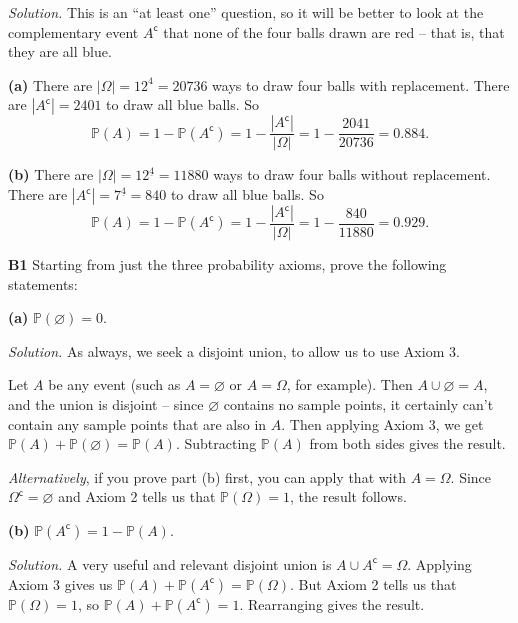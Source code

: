 \documentclass[
  a4paper,
]{book}
\theoremstyle{definition}
\theoremstyle{definition}
\theoremstyle{definition}
\theoremstyle{definition}
\theoremstyle{remark}
\begin{document}
\begin{myanswers}
\emph{Solution.} This is an ``at least one'' question, so it will be better to look at the complementary event \(A^\mathsf{c}\) that none of the four balls drawn are red -- that is, that they are all blue.

\textbf{(a)} There are \(|\Omega| = 12^4 = 20736\) ways to draw four balls with replacement. There are \(|A^\mathsf{c}| = 2401\) to draw all blue balls. So
\[ \mathbb P(A) = 1 - \mathbb P(A^\mathsf{c}) = 1 - \frac{|A^\mathsf{c}|}{|\Omega|} = 1 - \frac{2041}{20736} = 0.884 . \]

\textbf{(b)} There are \(|\Omega| = {12}^{\underline{4}} = 11880\) ways to draw four balls without replacement. There are \(|A^\mathsf{c}| = {7}^{\underline{4}} = 840\) to draw all blue balls. So
\[ \mathbb P(A) = 1 - \mathbb P(A^\mathsf{c}) = 1 - \frac{|A^\mathsf{c}|}{|\Omega|} = 1 - \frac{840}{11880} = 0.929 . \]

\end{myanswers}

\textbf{B1} Starting from just the three probability axioms, prove the following statements:

\textbf{(a)} \(\mathbb P(\varnothing) = 0\).

\begin{myanswers}
\emph{Solution.} As always, we seek a disjoint union, to allow us to use Axiom 3.

Let \(A\) be any event (such as \(A = \varnothing\) or \(A = \Omega\), for example). Then \(A \cup \varnothing = A\), and the union is disjoint -- since \(\varnothing\) contains no sample points, it certainly can't contain any sample points that are also in \(A\). Then applying Axiom 3, we get \(\mathbb P(A) + \mathbb P(\varnothing) = \mathbb P(A)\). Subtracting \(\mathbb P(A)\) from both sides gives the result.

\emph{Alternatively}, if you prove part (b) first, you can apply that with \(A = \Omega\). Since \(\Omega^\mathsf{c}= \varnothing\) and Axiom 2 tells us that \(\mathbb P(\Omega) = 1\), the result follows.

\end{myanswers}

\textbf{(b)} \(\mathbb P(A^\mathsf{c}) = 1 - \mathbb P(A)\).

\begin{myanswers}
\emph{Solution.} A very useful and relevant disjoint union is \(A \cup A^\mathsf{c}= \Omega\). Applying Axiom 3 gives us \(\mathbb P(A) + \mathbb P(A^\mathsf{c}) = \mathbb P(\Omega)\). But Axiom 2 tells us that \(\mathbb P(\Omega) = 1\), so \(\mathbb P(A) + \mathbb P(A^\mathsf{c}) = 1\). Rearranging gives the result.

\end{myanswers}
\end{document}
